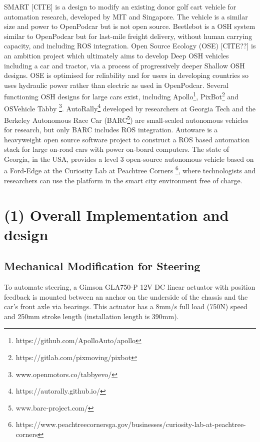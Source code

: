 \documentclass[a4paper]{article}
\begin{document}
SMART [CITE] is a design to modify an existing donor golf cart vehicle for automation research, developed by MIT and Singapore. The vehicle is a similar size and power to OpenPodcar but is not open source. Beetlebot \cite{beetlebot} is a OSH system similar to OpenPodcar but for last-mile freight delivery, without human carrying capacity, and including ROS integration. Open Source Ecology (OSE) [CITE??] is an ambition project which ultimately aims to develop Deep OSH vehicles including a car and tractor, via a process of progressively deeper Shallow OSH designs.  OSE is optimised for reliability and for users in developing countries so uses hydraulic power rather than electric as used in OpenPodcar. Several functioning OSH designs for large cars exist, including Apollo\footnote{https://github.com/ApolloAuto/apollo}, PixBot\footnote{https://gitlab.com/pixmoving/pixbot} and OSVehicle Tabby \footnote{www.openmotors.co/tabbyevo/}. AutoRally\footnote{https://autorally.github.io/} \cite{goldfain2019autorally} developed by researchers at Georgia Tech and the Berkeley Autonomous Race Car (BARC\footnote{www.barc-project.com/}) are small-scaled autonomous vehicles for research, but only BARC includes ROS integration. Autoware \cite{kato2018autoware} is a heavyweight open source software project to construct a ROS based automation stack for large on-road cars with power on-board computers. The state of Georgia, in the USA, provides a level 3 open-source autonomous vehicle based on a Ford-Edge at the Curiosity Lab at Peachtree Corners \footnote{https://www.peachtreecornersga.gov/businesses/curiosity-lab-at-peachtree-corners}, where technologists and researchers can use the platform in the smart city environment free of charge. 






\section{(1) Overall Implementation and design}\label{h.1u7vph94gfbt}

\subsection{Mechanical Modification for Steering}

To automate steering, a Gimson GLA750-P 12V DC linear actuator with position feedback is mounted between an anchor on the underside of the chassis and the car's front axle via bearings.  This actuator has a 8mm/s full load (750N) speed and 250mm stroke length (installation length is 390mm).  
\end{document}
